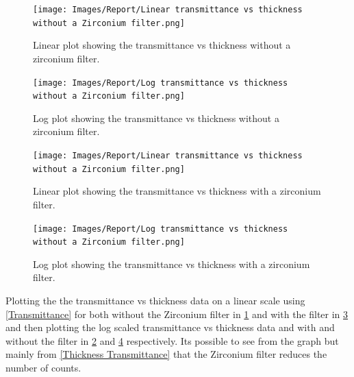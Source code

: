 \documentclass[12pt]{article}
\begin{document}
\begin{multicols}{2}
\begin{figure}[H]
\centering
\texttt{[image: Images/Report/Linear transmittance vs thickness without a Zirconium filter.png]}
\caption{Linear plot showing the transmittance vs thickness without a zirconium filter. }
\label{Linear Thick No Filter}
\end{figure}

\begin{figure}[H]
\centering
\texttt{[image: Images/Report/Log transmittance vs thickness without a Zirconium filter.png]}
\caption{Log plot showing the transmittance vs thickness without a zirconium filter. }
\label{Log Thick No Filter}
\end{figure}
\end{multicols}

\begin{multicols}{2}
\begin{figure}[H]
\centering
\texttt{[image: Images/Report/Linear transmittance vs thickness without a Zirconium filter.png]}
\caption{Linear plot showing the transmittance vs thickness with a zirconium filter. }
\label{Linear Thick Filter}
\end{figure}

\begin{figure}[H]
\centering
\texttt{[image: Images/Report/Log transmittance vs thickness without a Zirconium filter.png]}
\caption{Log plot showing the transmittance vs thickness with a zirconium filter. }
\label{Log Thick Filter}
\end{figure}
\end{multicols}

Plotting the the transmittance vs thickness data on a linear scale using \cref{Transmittance} for both without the Zirconium filter in \cref{Linear Thick No Filter} and with the filter in \cref{Linear Thick Filter} and then plotting the log scaled transmittance vs thickness data and with and without the filter in \cref{Log Thick No Filter} and \cref{Log Thick Filter} respectively. Its possible to see from the graph but mainly from \cref{Thickness Transmittance} that the Zirconium filter reduces the number of counts.
\end{document}
